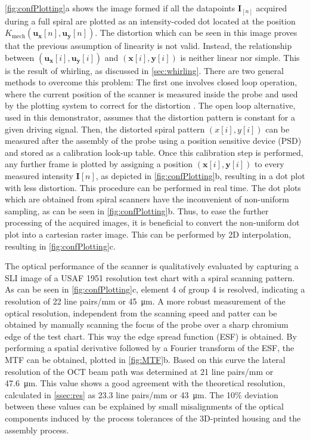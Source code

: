 \documentclass[10pt]{iopart}
\begin{document}
\autoref{fig:confPlotting}a shows the image formed if all the datapoints $\mathbf{I}_{[n]}$ acquired during a full spiral are plotted as an intensity-coded dot located at the position $K_\mathrm{mech}(\mathbf{u_x}[n], \mathbf{u_y}[n])$. The distortion which can be seen in this image proves that the previous assumption of linearity is not valid. Instead, the relationship between $(\mathbf{u_x}[i], \mathbf{u_y}[i])$ and $(\mathbf{x}[i], \mathbf{y}[i])$ is neither linear nor simple. This is the result of whirling, as discussed in \autoref{sec:whirling}. There are two general methods to overcome this problem: The first one involves closed loop operation, where the current position of the scanner is measured inside the probe and used by the plotting system to correct for the distortion \cite{Yeoh2014}. The open loop alternative, used in this demonstrator, assumes that the distortion pattern is constant for a given driving signal. Then, the distorted spiral pattern $(x[i], y[i])$ can be measured after the assembly of the probe using a position sensitive device (PSD) and stored as a calibration look-up table. Once this calibration step is performed, any further frame is plotted by assigning a position $(\mathbf{x}[i], \mathbf{y}[i])$ to every measured intensity $\mathbf{I}[n]$, as depicted in \autoref{fig:confPlotting}b, resulting in a dot plot with less distortion. This procedure can be performed in real time. The dot plots which are obtained from spiral scanners have the inconvenient of non-uniform sampling, as can be seen in \autoref{fig:confPlotting}b. Thus, to ease the further processing of the acquired images, it is beneficial to convert the non-uniform dot plot into a cartesian raster image. This can be performed by 2D interpolation, resulting in \autoref{fig:confPlotting}c.

The optical performance of the scanner is qualitatively evaluated by capturing a SLI image of a USAF 1951 resolution test chart with a spiral scanning pattern. As can be seen in \autoref{fig:confPlotting}c, element 4 of group 4 is resolved, indicating a resolution of 22 line pairs/mm or \SI{45}{\micro\meter}. A more robust measurement of the optical resolution, independent from the scanning speed and patter can be obtained by manually scanning the focus of the probe over a sharp chromium edge of the test chart. This way the edge spread function (ESF) is obtained. By performing a spatial derivative followed by a Fourier transform of the ESF, the MTF can be obtained, plotted in \autoref{fig:MTF}b. Based on this curve the lateral resolution of the OCT beam path was determined at 21 line pairs/mm or \SI{47.6}{\micro\meter}. This value shows a good agreement with the theoretical resolution, calculated in \autoref{ssec:res} as 23.3 line pairs/mm or \SI{43}{\micro\meter}. The 10\% deviation between these values can be explained by small misalignments of the optical components induced by the process tolerances of the 3D-printed housing and the assembly process.
\end{document}
